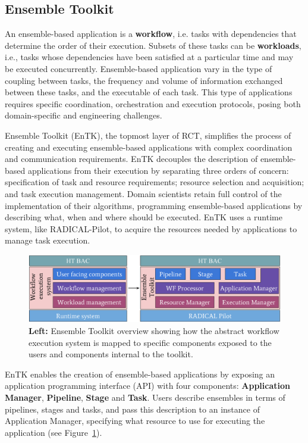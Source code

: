 \subsection{Ensemble Toolkit}\label{ssec:entk}

An ensemble-based application is a \textbf{workflow}, i.e. tasks
with dependencies that determine the order of their execution. Subsets of
these tasks can be \textbf{workloads}, i.e., tasks whose dependencies have
been satisfied at a particular time and may be executed concurrently.
Ensemble-based application vary in the type of coupling between tasks, the
frequency and volume of information exchanged between these tasks, and the
executable of each task. This type of applications requires specific
coordination, orchestration and execution protocols, posing both
domain-specific and engineering challenges.

Ensemble Toolkit (EnTK), the topmost layer of RCT, simplifies the process of
creating and executing ensemble-based applications with complex coordination
and communication requirements. EnTK decouples the description of
ensemble-based applications from their execution by separating three orders
of concern: specification of task and resource requirements; resource
selection and acquisition; and task execution management. Domain scientists
retain full control of the implementation of their algorithms, programming
ensemble-based applications by describing what, when and where should be
executed. EnTK uses a runtime system, like RADICAL-Pilot, to acquire the
resources needed by applications to manage task execution.

\begin{figure}
  \centering
  \includegraphics[width=\columnwidth]{entk_overview.pdf}
  \caption{\textbf{Left:} Ensemble Toolkit overview showing how the abstract
  workflow execution system is mapped to specific components exposed
  to the users and components internal to the toolkit.}\label{fig:entk_arch}
\end{figure}


EnTK enables the creation of ensemble-based applications by exposing an 
application programming interface (API)
with four components: \textbf{Application Manager}, \textbf{Pipeline},
\textbf{Stage} and \textbf{Task}. Users describe ensembles in terms of
pipelines, stages and tasks, and pass this description to an instance
of Application Manager, specifying what resource to use for executing the
application (see Figure~\ref{fig:entk_arch}).


